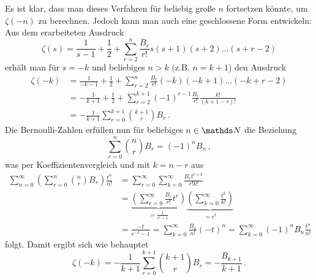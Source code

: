 \begin{bewe}
Es ist klar, dass man dieses Verfahren für beliebig große $n$ fortsetzen könnte, um $\zeta(-n)$ zu berechnen. Jedoch kann man auch eine geschlossene Form entwickeln: Aus dem erarbeiteten Ausdruck 
\[
	\zeta(s)
	= \frac 1{s-1} + \frac 12 + \sum_{r=2}^n \frac{B_r}{r!} s(s+1)(s+2)\ldots(s+r-2)
\]
erhält man für $s = -k$ und beliebiges $n > k$ (z.B. $n = k+1$) den Ausdruck
\begin{align*}
	\zeta(-k)
	&= \frac 1{-k-1} + \frac 12 + \sum_{r=2}^n \frac {B_r}{r!} (-k)(-k+1) \ldots (-k+r-2) \\
	&= - \frac 1{k+1} + \frac 12 + \sum_{r=2}^{k+1} (-1)^{r-1} \frac {B_r}{r!} \frac {k!}{(k+1-r)!} \\
	&= - \frac 1{k+1} \sum_{r=0}^{k+1} \binom {k+1}r B_r
	\,.
\end{align*}
Die Bernoulli-Zahlen erfüllen nun für beliebiges $n \in \NN$ die Beziehung
\[
	\sum_{r=0}^n \binom nr B_r = (-1)^n B_n
	\,,
\]
was per Koeffizientenvergleich und mit $k = n-r$ aus
\begin{align*}
	\sum_{n=0}^\infty \left( \sum_{r=0}^n \binom nr B_r \right) \frac {t^n}{n!}
	&= \sum_{r=0}^\infty \sum_{k=0}^\infty \frac {B_r t^{r+k}}{r!k!} \\
	&= \underbrace{\left( \sum_{r=0}^\infty \frac {B_r}{r!} t^r \right)}_{= \frac t{e^t - 1}} \underbrace{\left( \sum_{k=0}^\infty \frac {t^k}{k!} \right)}_{= e^t} \\
	&= \frac {-t}{e^{-t} - 1}
	= \sum_{k=0}^\infty \frac {B_n}{n!} (-t)^n
	= \sum_{k=0}^\infty (-1)^n B_n \frac {t^n}{n!}
\end{align*}
folgt. Damit ergibt sich wie behauptet
\[
	\zeta(-k) = - \frac 1{k+1} \sum_{r=0}^{k+1} \binom {k+1}r B_r = - \frac {B_{k+1}}{k+1}
	\,.
\]


\end{bewe}
